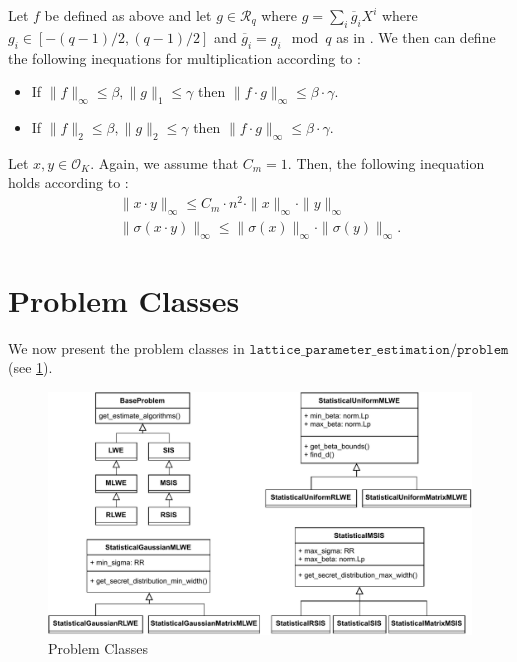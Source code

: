 \begin{theorem}
    Let $f$ be defined as above and let $g \in \mathcal{R}_q$ where $g = \sum_i \overline{g}_i X^i$ where $g_i \in \left[-(q-1)/2, (q-1)/2\right]$ and $\overline{g}_i = g_i \mod q$ as in \cite{BDLOP18}. We then can define the following inequations for multiplication according to \cite{BDLOP18}:

    \begin{itemize}
        \item If $\|f\|_\infty \leq \beta, \|g\|_1 \leq \gamma$ then $\|f \cdot g\|_\infty \leq \beta \cdot \gamma$.
        \item If $\|f\|_2 \leq \beta, \|g\|_2 \leq \gamma$ then $\|f \cdot g\|_\infty \leq \beta \cdot \gamma$.
    \end{itemize}

    Let $x, y \in \mathcal{O}_K$. Again, we assume that $C_m = 1$. Then, the following inequation holds according to \cite{DPSZ12}:
    \begin{align}
        \| x \cdot y \|_\infty \leq C_m \cdot n^2 \cdot \| x \|_\infty \cdot \| y \|_\infty \\
        \| \sigma(x \cdot y) \|_\infty \leq  \| \sigma(x) \|_\infty \cdot \| \sigma(y) \|_\infty.
    \end{align}
\end{theorem}




\section{Problem Classes}
We now present the problem classes in $\texttt{lattice\_parameter\_estimation/problem}$ (see \cref{fig:problem-classes}).

\begin{figure}[h]
    \centering
    \includegraphics[width=1\textwidth]{graphics/problem_classes.pdf}
    \caption{Problem Classes}\label{fig:problem-classes}
\end{figure}

